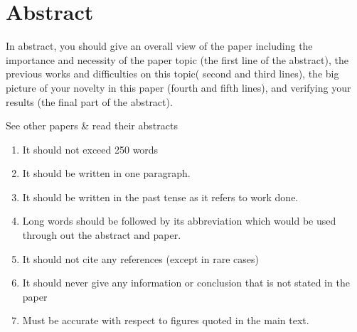 \documentclass{article}
\begin{document}
    \section{Abstract}
    
In abstract, you should give an overall view of the paper including the importance and necessity of the paper topic (the first line of the abstract), the previous works and difficulties on this topic( second and third lines), the big picture of your novelty in this paper (fourth and fifth lines), and verifying your results (the final part of the abstract).

See other papers \& read their abstracts

\begin{enumerate}

\item It should not exceed 250 words
\item It should be written in one paragraph.
\item It should be written in the past tense as it refers to work done.
\item Long words should be followed by its abbreviation which would be used through out the abstract and paper.
\item It should not cite any references (except in rare cases)
\item It should never give any information or conclusion that is not stated in the paper
\item Must be accurate with respect to figures quoted in the main text.

\end{enumerate}
\end{document}

